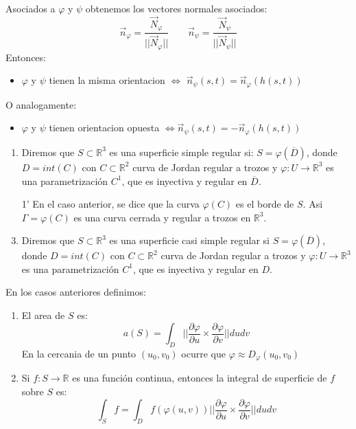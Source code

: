 \begin{definición}
    Asociados a $\varphi$ y $\psi$ obtenemos los vectores normales asociados:
    $$ \vec{n}_{\varphi} = \frac{\vec{N}_{\varphi}}{||\vec{N}_{\varphi}||} \qquad \vec{n}_{\psi} = \frac{\vec{N}_{\psi}}{||\vec{N}_{\psi}||} $$
    Entonces:
    \begin{itemize}
        \item   $\varphi$ y $\psi$ tienen la misma orientacion $\Leftrightarrow$ $\vec{n}_{\psi}(s,t) = \vec{n}_{\varphi}(h(s,t))$\\
    \end{itemize}
    O analogamente:
    \begin{itemize}
        \item   $\varphi$ y $\psi$ tienen orientacion opuesta $\Leftrightarrow \vec{n}_{\psi}(s,t) = -\vec{n}_{\varphi}(h(s,t))$\\
    \end{itemize}
\end{definición}

\begin{definición}
    \begin{enumerate}
        \item Diremos que $S \subset \mathbb{R}^3$ es una superficie simple regular si: $S = \varphi(\overline{D})$, donde $D=int(C)$ con $C \subset \mathbb{R}^2$ curva de Jordan regular a trozos y $\varphi: U \to \mathbb{R}^3$ es una parametrización $C^1$, que es inyectiva y regular en $\overline{D}$.
        \item[1'] En el caso anterior, se dice que la curva $\varphi(C)$ es el borde de $S$. Asi $\Gamma = \varphi(C)$ es una curva cerrada y regular a trozos en $\mathbb{R}^3$.
        \item Diremos que $S \subset \mathbb{R}^3$ es una superficie casi simple regular si $S=\varphi(\overline{D})$, donde $D=int(C)$ con $C \subset \mathbb{R}^2$ curva de Jordan regular a trozos y $\varphi: U \to \mathbb{R}^3$ es una parametrización $C^1$, que es inyectiva y regular en $D$.
    \end{enumerate}
\end{definición}

\begin{definición}
    En los casos anteriores definimos:
    \begin{enumerate}
        \item El area de $S$ es: 
        $$ a(S) = \int_D ||\frac{\partial \varphi}{\partial u} \times \frac{\partial \varphi}{\partial v}|| dudv $$
        En la cercania de un punto $(u_0,v_0)$ ocurre que $\varphi \approx D_\varphi (u_0,v_0)$
        \item Si $f: S \to \mathbb{R}$ es una función continua, entonces la integral de superficie de $f$ sobre $S$ es:
        $$ \int_S f = \int_D f(\varphi(u,v)) ||\frac{\partial \varphi}{\partial u} \times \frac{\partial \varphi}{\partial v}|| dudv $$
    \end{enumerate}
\end{definición}

